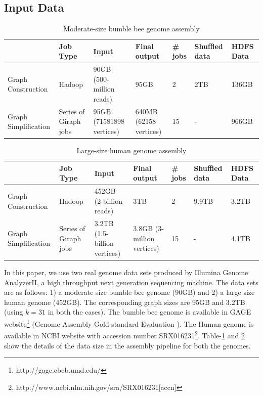 \documentclass[10pt, conference, compsocconf]{IEEEtran}
\begin{document}
\subsection {Input Data} \label{InputData}
\begin{table}
\begin{center}
    \begin{tabular}{ |p{1cm} | p{0.7cm} | p{1cm} | p{0.7cm} | p{0.7cm} | p{0.7cm} | p{0.7cm}|} \hline
    & Job Type & Input & Final output & \# jobs & Shuffled data & HDFS Data \\ \hline
    Graph Construction & Hadoop & 90GB (500-million reads) & 95GB & 2 & 2TB & 136GB \\ \hline
    Graph Simplification & Series of Giraph jobs & 95GB (71581898 vertices) & 640MB (62158 vertices) & 15 & - & 966GB \\ \hline    
    \end{tabular}
    \caption{Moderate-size bumble bee genome assembly}
	\label{table:BumbleBeeData}
\end{center}
\end{table}

\begin{table}
\begin{center}
    \begin{tabular}{ |p{1cm} | p{0.7cm} | p{1cm} | p{0.7cm} | p{0.7cm} | p{0.7cm} | p{0.7cm}|} \hline
    & Job Type & Input & Final output & \# jobs & Shuffled data & HDFS Data \\ \hline
    Graph Construction & Hadoop & 452GB (2-billion reads) & 3TB & 2 & 9.9TB & 3.2TB \\ \hline
    Graph Simplification & Series of Giraph jobs & 3.2TB (1.5-billion vertices) & 3.8GB (3-million vertices) & 15 & - & 4.1TB \\ \hline    
    \end{tabular}
    \caption{Large-size human genome assembly}
	\label{table:HumanData}
\end{center}
\vspace{-3.0em}
\end{table}
In this paper, we use two real genome data sets produced by Illumina Genome AnalyzerII, a high throughput next generation sequencing machine. The data sets are as follows: 1) a moderate size bumble bee genome (90GB) and 2) a large size human genome (452GB). The corresponding graph sizes are 95GB and 3.2TB (using $k=31$ in both the cases). The bumble bee genome is available in GAGE website\footnote{http://gage.cbcb.umd.edu/} (Genome Assembly Gold-standard Evaluation \cite{bio:gage}). The Human genome is available in NCBI website with accession number SRX016231\footnote{http://www.ncbi.nlm.nih.gov/sra/SRX016231[accn]}. Table-\ref{table:BumbleBeeData} and \ref{table:HumanData} show the details of the data size in the assembly pipeline for both the genomes. 
\end{document}
